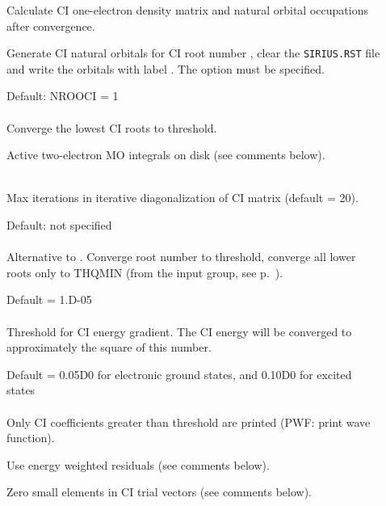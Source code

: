 \begin{description}
\item[]
  Calculate CI one-electron density matrix and natural
  orbital
  occupations after convergence.

\item[]
  Generate CI natural
  orbitals for CI root
  number ,
  clear the \verb|SIRIUS.RST| file and write the orbitals with label .
  The  option must be specified.

\item[]
  Default: NROOCI = 1\\
   \\
  Converge the lowest  CI roots to threshold.

\item[]
  Active two-electron MO integrals on disk (see comments below).

\item[]
   \\
  Max iterations in iterative diagonalization of CI matrix (default = 20).

\item[]
  Default: not specified\\
   \\
  Alternative to .  Converge root number 
  to threshold, converge all lower roots only to THQMIN
  (from the  input group, see
  p.~\pageref{ref-optinp}).

\item[]
  Default = 1.D-05\\
   \\
  Threshold for CI energy gradient.  The CI energy will be converged to
  approximately the square of this number.

\item[]
  Default = 0.05D0 for electronic ground states, and 0.10D0 for
  excited states\\
   \\
  Only CI coefficients greater than threshold are printed
  (PWF: print wave function).

\item[]
  Use energy weighted residuals (see comments below).

\item[]
  Zero small elements in CI trial vectors (see comments below).
\end{description}


